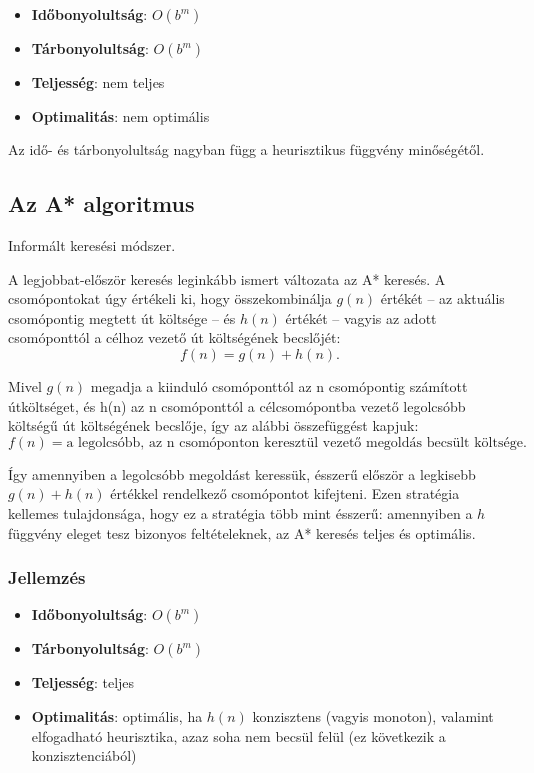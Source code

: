 \begin{itemize}
    \item {\bf Időbonyolultság}: $O(b^m)$
    \item {\bf Tárbonyolultság}: $O(b^m)$
    \item {\bf Teljesség}: nem teljes
    \item {\bf Optimalitás}: nem optimális
\end{itemize}

\begin{megjegyzes}
    Az idő- és tárbonyolultság nagyban függ a heurisztikus függvény
    minőségétől.
\end{megjegyzes}

\subsection{Az A* algoritmus}

Informált keresési módszer.

A legjobbat-először keresés leginkább ismert változata az A* keresés. A
csomópontokat úgy értékeli ki, hogy összekombinálja $g(n)$ értékét – az aktuális
csomópontig megtett út költsége – és $h(n)$ értékét – vagyis az adott
csomóponttól a célhoz vezető út költségének becslőjét: \[
    f(n) = g(n) + h(n)
.\]

Mivel $g(n)$ megadja a kiinduló csomóponttól az n csomópontig számított
útköltséget, és h(n) az n csomóponttól a célcsomópontba vezető legolcsóbb
költségű út költségének becslője, így az alábbi összefüggést kapjuk:
\[
    f(n) = \text{a legolcsóbb, az n csomóponton keresztül vezető megoldás
    becsült költsége}
.\]

Így amennyiben a legolcsóbb megoldást keressük, ésszerű először a legkisebb
$g(n) + h(n)$ értékkel rendelkező csomópontot kifejteni. Ezen stratégia
kellemes tulajdonsága, hogy ez a stratégia több mint ésszerű: amennyiben a $h$
függvény eleget tesz bizonyos feltételeknek, az A* keresés teljes és optimális.

\subsubsection{Jellemzés}

\begin{itemize}
    \item {\bf Időbonyolultság}: $O(b^m)$
    \item {\bf Tárbonyolultság}: $O(b^m)$
    \item {\bf Teljesség}: teljes
    \item {\bf Optimalitás}: optimális, ha $h(n)$ konzisztens (vagyis monoton),
        valamint elfogadható heurisztika, azaz soha nem becsül felül (ez
        következik a konzisztenciából)
\end{itemize}
